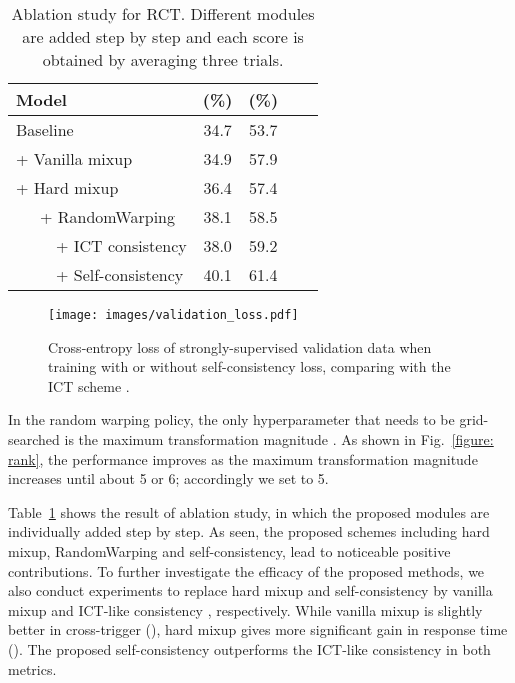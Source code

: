 \documentclass[a4paper]{article}
\begin{document}
\begin{table}[t!]
    \centering
    \caption{Ablation study for RCT. Different modules are added step by step and each score is obtained by averaging three trials.}
    \begin{tabular}{lcccc}
        \toprule
        \textbf{Model}  & \textbf{} (\%)  & \textbf{} (\%) \\
        \midrule
        Baseline                                  & 34.7 & 53.7 \\
            + Vanilla mixup \cite{zhang2017mixup} & 34.9 & 57.9 \\
            + Hard mixup                          & 36.4 & 57.4 \\
            \ \ \ + RandomWarping                 & 38.1 & 58.5 \\
            \ \ \ \ \ + ICT consistency\cite{verma2019interpolation} & 38.0 & 59.2 \\
            \ \ \ \ \ + Self-consistency          & 40.1 & 61.4 \\
        \bottomrule
    \end{tabular}
    \label{table: ablation_study}
    \vspace{-2mm}
\end{table}

\begin{figure}[htb]
\begin{minipage}[b]{1.0\linewidth}
  \centering
  \centerline{\texttt{[image: images/validation\_loss.pdf]}}
  \vspace{-2mm}
\end{minipage}
\caption{Cross-entropy loss of strongly-supervised validation data when training with or without self-consistency loss, comparing with the ICT scheme \cite{verma2019interpolation}.}
\label{figure: validation_loss}
\vspace{-6mm}
\end{figure}

In the random warping policy, the only hyperparameter that needs to be grid-searched is the maximum transformation magnitude . As shown in Fig.~\ref{figure: rank}, the performance improves as the maximum transformation magnitude increases until about 5 or 6; accordingly we set  to 5. 

Table~\ref{table: ablation_study} shows the result of ablation study, in which the proposed modules are individually added step by step. As seen, the proposed schemes including hard mixup, RandomWarping and self-consistency, lead to noticeable positive contributions. To further investigate the efficacy of the proposed methods, we also conduct experiments to replace hard mixup and self-consistency by vanilla mixup \cite{zhang2017mixup} and ICT-like consistency \cite{verma2019interpolation}, respectively. While vanilla mixup is slightly better in cross-trigger (), hard mixup gives more significant gain in response time (). The proposed self-consistency outperforms the ICT-like consistency in both metrics.
\end{document}
